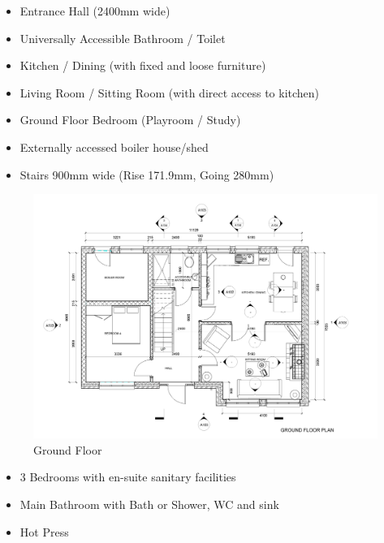 \begin{itemize}
	\item Entrance Hall (2400mm wide)
	\item Universally Accessible Bathroom / Toilet
	\item Kitchen / Dining (with fixed and loose furniture)
	\item Living Room / Sitting Room (with direct access to kitchen)
	\item Ground Floor Bedroom (Playroom / Study)
	\item Externally accessed boiler house/shed
	\item Stairs 900mm wide (Rise 171.9mm, Going 280mm)
\end{itemize}



\begin{figure}
	\centering
	\includegraphics[width=1.0\linewidth]{./img/P01GroundFloorLevel.jpg}
	\caption{Ground Floor}
	\label{fig:p01groundfloorlevel}
\end{figure}


\newpage

\begin{itemize}
	\item 3 Bedrooms with en-suite sanitary facilities
	\item Main Bathroom with Bath or Shower, WC and sink
	\item Hot Press
\end{itemize}



